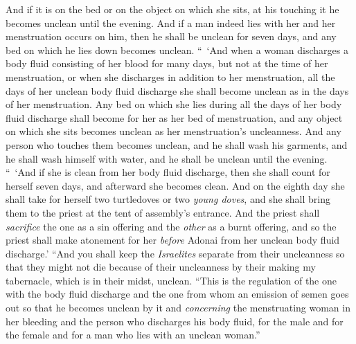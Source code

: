 \begin{biblechapter}
\verse And if it is on the bed or on the object on which she sits, at his touching it he becomes unclean until the evening.
\verse And if a man indeed lies with her and her menstruation occurs on him, then he shall be unclean for seven days, and any bed on which he lies down becomes unclean.
\verse “ ‘And when a woman discharges a body fluid consisting of her blood for many days, but not at the time of her menstruation, or when she discharges in addition to her menstruation, all the days of her unclean body fluid discharge she shall become unclean as in the days of her menstruation.
\verse Any bed on which she lies during all the days of her body fluid discharge shall become for her as her bed of menstruation, and any object on which she sits becomes unclean as her menstruation’s uncleanness.
\verse And any person who touches them becomes unclean, and he shall wash his garments, and he shall wash himself with water, and he shall be unclean until the evening.
\verse “ ‘And if she is clean from her body fluid discharge, then she shall count for herself seven days, and afterward she becomes clean.
\verse And on the eighth day she shall take for herself two turtledoves or two \textit{young doves}, and she shall bring them to the priest at the tent of assembly’s entrance.
\verse And the priest shall \textit{sacrifice} the one as a sin offering and the \textit{other} as a burnt offering, and so the priest shall make atonement for her \textit{before} Adonai from her unclean body fluid discharge.’
\verse “And you shall keep the \textit{Israelites} separate from their uncleanness so that they might not die because of their uncleanness by their making my tabernacle, which is in their midst, unclean.
\verse “This is the regulation of the one with the body fluid discharge and the one from whom an emission of semen goes out so that he becomes unclean by it
\verse and \textit{concerning} the menstruating woman in her bleeding and the person who discharges his body fluid, for the male and for the female and for a man who lies with an unclean woman.”
\end{biblechapter}

